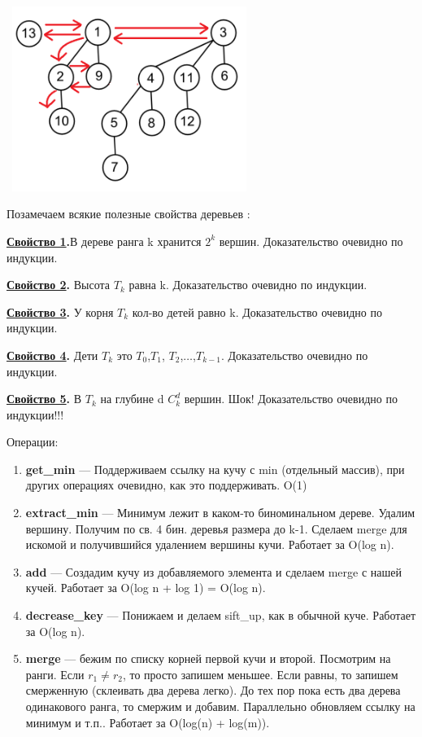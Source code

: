 \documentclass{article}
\begin{document}
\includegraphics[width=8cm, height=6cm]{9.2.png}


Позамечаем всякие полезные свойства деревьев :

\textbf{\uline{Свойство 1}.}В дереве ранга k хранится $2^k$ вершин. Доказательство очевидно по индукции.

\textbf{\uline{Свойство 2}.} Высота $T_k$ равна k.  Доказательство очевидно по индукции.

\textbf{\uline{Свойство 3}.} У корня $T_k$ кол-во детей равно k. Доказательство очевидно по индукции.

\textbf{\uline{Свойство 4}.} Дети $T_k$ это  $T_0$,$T_1$, $T_2$,$\ldots$,$T_{k-1}$. Доказательство очевидно по индукции.

\textbf{\uline{Свойство 5}.} В $T_k$ на глубине d $C_k^d$ вершин. Шок! Доказательство очевидно по индукции!!!

Операции:

\begin{enumerate}
    \item \textbf{get\_min}  --- Поддерживаем ссылку на кучу с min (отдельный массив), при других операциях очевидно, как это поддерживать. O(1)

    \item \textbf{extract\_min} --- Минимум лежит в каком-то биноминальном дереве. Удалим вершину. Получим по св. 4 бин. деревья размера до k-1. Сделаем merge для искомой и получившийся удалением  вершины кучи. Работает за O(log n).
    
    \item \textbf{add}  --- Создадим кучу из добавляемого элемента и сделаем merge с нашей кучей. Работает за O(log n + log 1) = O(log n).
    
    \item \textbf{decrease\_key} --- Понижаем и делаем sift\_up, как в обычной куче. Работает за O(log n).

    \item \textbf{merge} --- бежим по списку корней первой кучи и второй. Посмотрим на ранги. Если $r_1\neq r_2$, то просто запишем меньшее. Если равны, то запишем смерженную (склеивать два дерева легко). До тех пор пока есть два дерева одинакового ранга, то смержим и добавим. Параллельно обновляем ссылку на минимум и т.п.. Работает за O(log(n) + log(m)). 
\end{enumerate}
\end{document}
